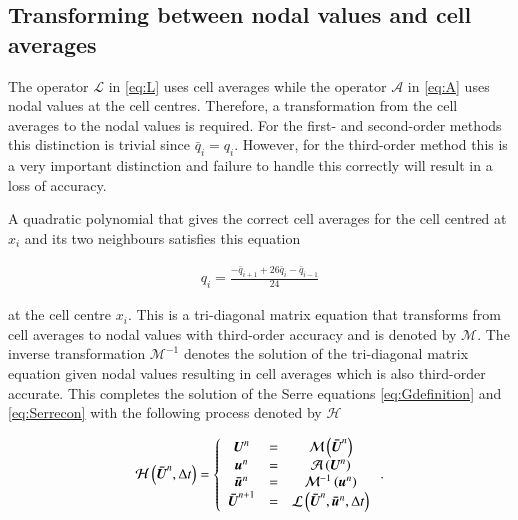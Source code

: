 \documentclass[SingleSpace,12pt,Proceedings]{Serre_ASCE}
\begin{document}
\subsection{Transforming between nodal values and cell averages} %
The operator $\mathcal{L}$ in \eqref{eq:L} uses cell averages while the operator $\mathcal{A}$ in \eqref{eq:A} uses nodal values at the cell centres. Therefore, a transformation from the cell averages to the nodal values is required. For the first- and second-order methods this distinction is trivial since $\bar{q}_i = q_i$. However, for the third-order method this is a very important distinction and failure to handle this correctly will result in a loss of accuracy. 

A quadratic polynomial that gives the correct cell averages for the cell centred at $x_i$ and its two neighbours satisfies this equation
\begin{linenomath*}
\begin{gather*} %
q_i = \frac{- \bar{q}_{i+1} + 26\bar{q}_{i} - \bar{q}_{i-1}}{24}
\end{gather*}
\end{linenomath*}
at the cell centre $x_i$. This is a tri-diagonal matrix equation that transforms from cell averages to nodal values with third-order accuracy and is denoted by $\mathcal{M}$. The inverse transformation $\mathcal{M}^{-1}$ denotes the solution of the tri-diagonal matrix equation given nodal values resulting in cell averages which is also third-order accurate. This completes the solution of the Serre equations \eqref{eq:Gdefinition} and \eqref{eq:Serrecon} with the following process denoted by $\mathcal{H}$
\begin{linenomath*}
\begin{gather*}
\mathcal{H}\left(\boldsymbol{\bar{U}}^n,\Delta t \right) = \left\lbrace 
\begin{array}{c c c} 
	\boldsymbol{U}^n &=& \mathcal{M}\left(\boldsymbol{\bar{U}}^n\right) \\
	\boldsymbol{u}^n &=& \mathcal{A}\left(\boldsymbol{U}^n\right) \\
	\boldsymbol{\bar{u}}^n &=&  \mathcal{M}^{-1}\left(\boldsymbol{u}^n\right) \\
	\boldsymbol{\bar{U}}^{n+1} &=& \mathcal{L}\left(\boldsymbol{\bar{U}}^{n},\boldsymbol{\bar{u}}^n,\Delta t\right)							
\end{array} \right. .
\end{gather*}
\end{linenomath*}
\end{document}
